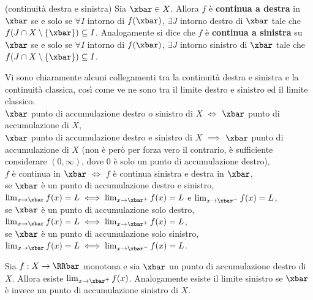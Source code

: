 \documentclass[11pt]{article}
\begin{document}
	\begin{definition}
		(continuità destra e sinistra) Sia $\xbar \in X$. Allora $f$ è \textbf{continua
		a destra} in $\xbar$ se e solo se $\forall I$ intorno di $f(\xbar)$,
		$\exists J$ intorno destro di $\xbar$ tale che $f(J \cap X \setminus \{\xbar\}) \subseteq I$. Analogamente si dice che $f$ è \textbf{continua a sinistra} su $\xbar$ se e solo se $\forall I$ intorno
		di $f(\xbar)$, $\exists J$ intorno sinistro di $\xbar$ tale che
		$f(J \cap X \setminus \{\xbar\}) \subseteq I$.
	\end{definition}

	\begin{remark}
		Vi sono chiaramente alcuni collegamenti tra la continuità destra e sinistra e la continuità classica,
		così come ve ne sono tra il limite destro e sinistro ed il limite classico. \\
		
		\li $\xbar$ punto di accumulazione destro o sinistro di $X$ $\iff$ $\xbar$ punto di accumulazione di $X$, \\
		\li $\xbar$ punto di accumulazione destro e sinistro di $X$ $\implies$ $\xbar$ punto di accumulazione di $X$ (non
		è però per forza vero il contrario, è sufficiente considerare $(0, \infty)$, dove $0$ è solo un punto di
		accumulazione destro), \\
		\li $f$ è continua in $\xbar$ $\iff$ $f$ è continua sinistra e destra in $\xbar$, \\
		\li se $\xbar$ è un punto di accumulazione destro e sinistro, $\lim_{x \to \xbar} f(x) = L \iff \lim_{x \to \xbar^+} f(x) = L$ e $\lim_{x \to \xbar^-} f(x) = L$, \\
		\li se $\xbar$ è un punto di accumulazione solo destro, $\lim_{x \to \xbar} f(x) = L \iff \lim_{x \to \xbar^+} f(x) = L$, \\
		\li se $\xbar$ è un punto di accumulazione solo sinistro, $\lim_{x \to \xbar} f(x) = L \iff \lim_{x \to \xbar^-} f(x) = L$.
	\end{remark}
	
	\begin{proposition}
		Sia $f : X \to \RRbar$ monotona e sia $\xbar$ un punto di
		accumulazione destro di $X$. Allora esiste $\lim_{x \to \xbar^+} f(x)$.
		Analogamente esiste il limite sinistro se $\xbar$ è invece un punto di
		accumulazione sinistro di $X$.
	\end{proposition}
\end{document}
